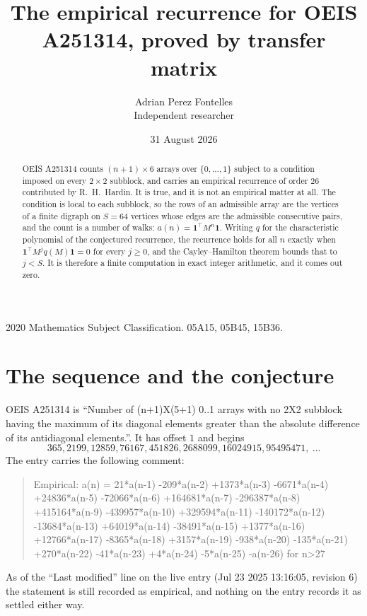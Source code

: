 \documentclass[11pt,a4paper]{article}
\title{The empirical recurrence for OEIS A251314, proved by transfer matrix}
\author{Adrian Perez Fontelles\\ \small Independent researcher}
\date{31 August 2026}
\theoremstyle{plain}
\theoremstyle{definition}
\begin{document}
\maketitle

\begin{abstract}
OEIS A251314 counts $(n+1)\times6$ arrays over $\{0,\dots,1\}$ subject to a condition imposed on
every $2\times2$ subblock, and carries an empirical recurrence of order $26$ contributed
by R.~H.~Hardin. It is true, and it is not an empirical matter at all. The condition is local
to each subblock, so the rows of an admissible array are the vertices of a finite digraph
on $S=64$ vertices whose edges are the admissible consecutive pairs, and the count is a
number of walks: $a(n)=\mathbf{1}^{\!\top}M^{n}\mathbf{1}$. Writing $q$
for the characteristic polynomial of the conjectured recurrence, the recurrence holds for all
$n$ exactly when $\mathbf{1}^{\!\top}M^{j}q(M)\mathbf{1}=0$ for every $j\ge0$, and the
Cayley--Hamilton theorem bounds that to $j<S$. It is therefore a finite computation in exact
integer arithmetic, and it comes out zero.
\end{abstract}

\noindent\small 2020 Mathematics Subject Classification. 05A15, 05B45, 15B36.\normalsize

\section{The sequence and the conjecture}

OEIS A251314 is ``Number of (n+1)X(5+1) 0..1 arrays with no 2X2 subblock having the maximum of its diagonal elements greater than the absolute difference of its antidiagonal elements.''. It has offset $1$ and begins
\[
365, 2199, 12859, 76167, 451826, 2688099, 16024915, 95495471,\ \dots
\]
The entry carries the following comment:
\begin{quote}\small
Empirical: a(n) = 21*a(n-1) -209*a(n-2) +1373*a(n-3) -6671*a(n-4) +24836*a(n-5) -72066*a(n-6) +164681*a(n-7) -296387*a(n-8) +415164*a(n-9) -439957*a(n-10) +329594*a(n-11) -140172*a(n-12) -13684*a(n-13) +64019*a(n-14) -38491*a(n-15) +1377*a(n-16) +12766*a(n-17) -8365*a(n-18) +3157*a(n-19) -938*a(n-20) -135*a(n-21) +270*a(n-22) -41*a(n-23) +4*a(n-24) -5*a(n-25) -a(n-26) for n>27
\end{quote}
As of the ``Last modified'' line on the live entry (Jul 23 2025 13:16:05, revision 6) the statement is
still recorded as empirical, and nothing on the entry records it as settled either way.
\end{document}

